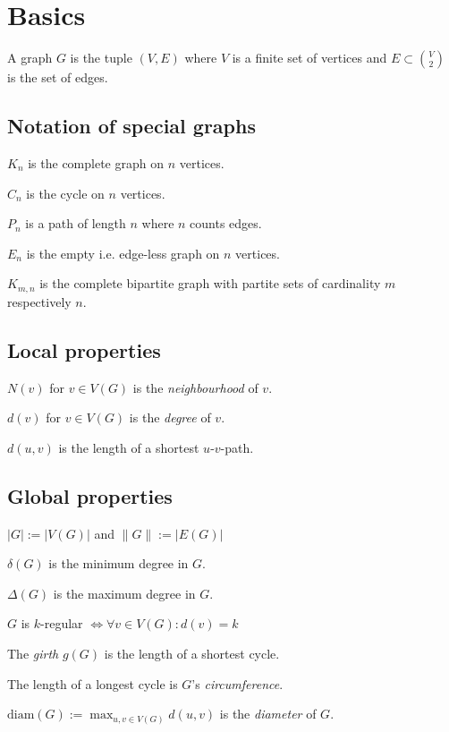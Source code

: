 \section*{Basics}

A graph $G$ is the tuple $(V,E)$ where $V$ is a finite set of vertices and $E \subset {V \choose 2}$ is the set of edges.

\subsection*{Notation of special graphs}

$K_n$ is the complete graph on $n$ vertices.

$C_n$ is the cycle on $n$ vertices.

$P_n$ is a path of length $n$ where $n$ counts edges.

$E_n$ is the empty i.e. edge-less graph on $n$ vertices.

$K_{m,n}$ is the complete bipartite graph with partite sets of cardinality $m$ respectively $n$.

\subsection*{Local properties}

$N(v)$ for $v \in V(G)$ is the \emph{neighbourhood} of $v$.

$d(v)$ for $v \in V(G)$ is the \emph{degree} of $v$.

$d(u,v)$ is the length of a shortest $u$-$v$-path.

\subsection*{Global properties}

$|G| := |V(G)|$ and $\|G\| := |E(G)|$

$\delta(G)$ is the minimum degree in $G$.

$\Delta(G)$ is the maximum degree in $G$.

\spacing

$G$ is $k$-regular $\iff \forall v \in V(G) : d(v) = k$

The \emph{girth} $g(G)$ is the length of a shortest cycle.

The length of a longest cycle is $G$'s \emph{circumference}.

\spacing

$\text{diam}(G) := \displaystyle\max_{u,v \in V(G)} d(u,v)$ is the \emph{diameter} of $G$.

